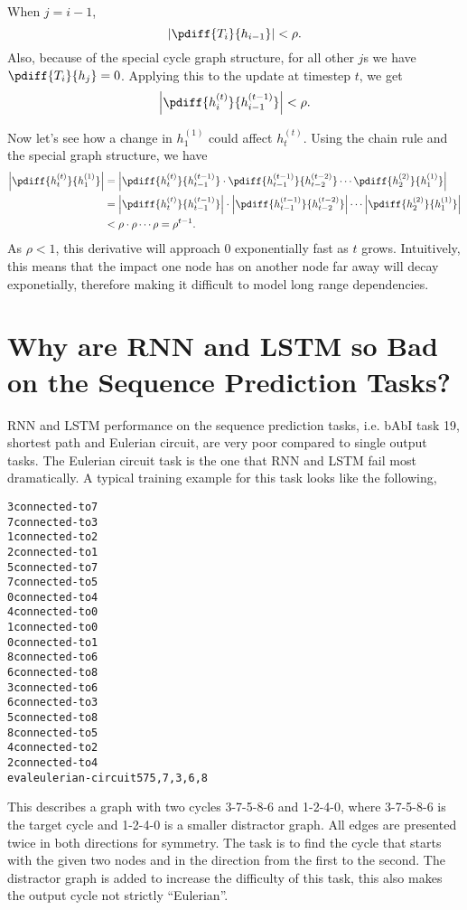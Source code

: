 When $j=i-1$, 
\begin{equation}
    \left|\pdiff{T_i}{h_{i-1}}\right| < \rho.
\end{equation}
Also, because of the special cycle graph structure, for all other $j$s we have
$\pdiff{T_i}{h_j}=0$.  Applying this to the update at timestep $t$, we get
\begin{equation}
    \left|\pdiff{h^{(t)}_i}{h^{(t-1)}_{i-1}}\right| < \rho.
\end{equation}

Now let's see how a change in $h^{(1)}_1$ could affect $h^{(t)}_t$.  Using
the chain rule and the special graph structure, we have
\begin{align}
    \left|\pdiff{h^{(t)}_t}{h^{(1)}_1}\right| &=
    \left|\pdiff{h^{(t)}_t}{h^{(t-1)}_{t-1}}\cdot
    \pdiff{h^{(t-1)}_{t-1}}{h^{(t-2)}_{t-2}}\cdots
    \pdiff{h^{(2)}_2}{h^{(1)}_1}\right| \nonumber\\
    &= 
    \left|\pdiff{h^{(t)}_t}{h^{(t-1)}_{t-1}}\right|\cdot
    \left|\pdiff{h^{(t-1)}_{t-1}}{h^{(t-2)}_{t-2}}\right|\cdots
    \left|\pdiff{h^{(2)}_2}{h^{(1)}_1}\right| \nonumber\\
    &< \rho\cdot \rho\cdots \rho = \rho^{t-1}.
\end{align}
As $\rho < 1$, this derivative will approach 0 exponentially fast as $t$
grows. Intuitively, this means that the impact one node has on another node
far away will decay exponetially, therefore making it difficult to model long
range dependencies.



\section{Why are RNN and LSTM so Bad on the Sequence Prediction Tasks?}

RNN and LSTM performance on the sequence prediction tasks, i.e. bAbI task 19,
shortest path and Eulerian circuit, are very poor compared to single output
tasks.  The Eulerian circuit task is the one that RNN and LSTM fail most
dramatically.  A typical training example for this task looks like the
following,
\begin{framed}
\begin{alltt}
3 connected-to 7
7 connected-to 3
1 connected-to 2
2 connected-to 1
5 connected-to 7
7 connected-to 5
0 connected-to 4
4 connected-to 0
1 connected-to 0
0 connected-to 1
8 connected-to 6
6 connected-to 8
3 connected-to 6
6 connected-to 3
5 connected-to 8
8 connected-to 5
4 connected-to 2
2 connected-to 4
eval eulerian-circuit 5 7       5,7,3,6,8
\end{alltt}
\end{framed}
This describes a graph with two cycles 3-7-5-8-6 and 1-2-4-0, where 3-7-5-8-6
is the target cycle and 1-2-4-0 is a smaller distractor graph.  All edges are
presented twice in both directions for symmetry. The task is to find the cycle
that starts with the given two nodes and in the direction from the first to
the second.  The distractor graph is added to increase the difficulty of this
task, this also makes the output cycle not strictly ``Eulerian''.

